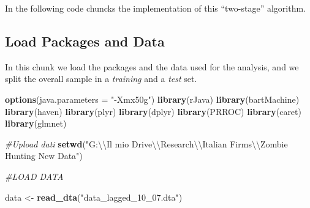 \documentclass[]{article}
\newenvironment{Shaded}{\begin{snugshade}}{\end{snugshade}}
\newcommand{\CharTok}[1]{\textcolor[rgb]{0.31,0.60,0.02}{#1}}
\newcommand{\CommentTok}[1]{\textcolor[rgb]{0.56,0.35,0.01}{\textit{#1}}}
\newcommand{\DataTypeTok}[1]{\textcolor[rgb]{0.13,0.29,0.53}{#1}}
\newcommand{\KeywordTok}[1]{\textcolor[rgb]{0.13,0.29,0.53}{\textbf{#1}}}
\newcommand{\NormalTok}[1]{#1}
\newcommand{\StringTok}[1]{\textcolor[rgb]{0.31,0.60,0.02}{#1}}
\begin{document}
\par

In the following code chuncks the implementation of this ``two-stage''
algorithm.

\hypertarget{load-packages-and-data}{%
\subsection{Load Packages and Data}\label{load-packages-and-data}}

In this chunk we load the packages and the data used for the analysis,
and we split the overall sample in a \textit{training} and a
\textit{test} set.

\begin{Shaded}
\begin{Highlighting}[]
\KeywordTok{options}\NormalTok{(}\DataTypeTok{java.parameters =} \StringTok{"-Xmx50g"}\NormalTok{)}
\KeywordTok{library}\NormalTok{(rJava)}
\KeywordTok{library}\NormalTok{(bartMachine)}
\KeywordTok{library}\NormalTok{(haven)}
\KeywordTok{library}\NormalTok{(plyr)}
\KeywordTok{library}\NormalTok{(dplyr)}
\KeywordTok{library}\NormalTok{(PRROC)}
\KeywordTok{library}\NormalTok{(caret)}
\KeywordTok{library}\NormalTok{(glmnet)}

\CommentTok{#Upload dati}
\KeywordTok{setwd}\NormalTok{(}\StringTok{"G:}\CharTok{\textbackslash{}\textbackslash{}}\StringTok{Il mio Drive}\CharTok{\textbackslash{}\textbackslash{}}\StringTok{Research}\CharTok{\textbackslash{}\textbackslash{}}\StringTok{Italian Firms}\CharTok{\textbackslash{}\textbackslash{}}\StringTok{Zombie Hunting New Data"}\NormalTok{)}

\CommentTok{#LOAD DATA}

\NormalTok{data <-}\StringTok{ }\KeywordTok{read_dta}\NormalTok{(}\StringTok{"data_lagged_10_07.dta"}\NormalTok{)}


\end{Highlighting}
\end{Shaded}
\end{document}
